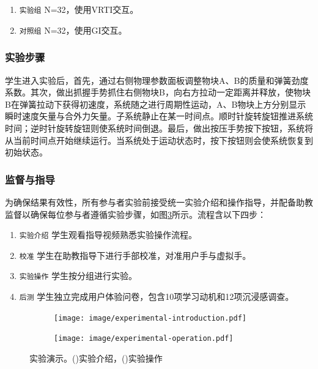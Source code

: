 \documentclass[runningheads]{llncs}
\begin{document}
\begin{enumerate}[label={\arabic*)}]
  \item \texttt{实验组} N=32，使用VRTI交互。
  \item \texttt{对照组} N=32，使用GI交互。
\end{enumerate}

\subsubsection{实验步骤}
学生进入实验后，首先，通过右侧物理参数面板调整物块A、B的质量和弹簧劲度系数。其次，做出抓握手势抓住右侧物块B，向右方拉动一定距离并释放，使物块B在弹簧拉动下获得初速度，系统随之进行周期性运动，A、B物块上方分别显示瞬时速度矢量与合外力矢量。子系统静止在某一时间点。顺时针旋转旋钮推进系统时间；逆时针旋转旋钮则使系统时间倒退。最后，做出按压手势按下按钮，系统将从当前时间点开始继续运行。当系统处于运动状态时，按下按钮则会使系统恢复到初始状态。

\subsubsection{监督与指导}
为确保结果有效性，所有参与者实验前接受统一实验介绍和操作指导，并配备助教监督以确保每位参与者遵循实验步骤，如图\ref{fig:experimental-procedure}所示。流程含以下四步：

\begin{enumerate}[label={\arabic*)}]
  \item \texttt{实验介绍} 学生观看指导视频熟悉实验操作流程。
  \item \texttt{校准} 学生在助教指导下进行手部校准，对准用户手与虚拟手。
  \item \texttt{实验操作} 学生按分组进行实验。
  \item \texttt{后测} 学生独立完成用户体验问卷，包含10项学习动机和12项沉浸感调查。
\end{enumerate}

\begin{figure}
  \begin{subfigure}{0.48\linewidth}
    \centering
    \texttt{[image: image/experimental-introduction.pdf]}
    \caption{}
    \label{fig:experimental-introduction}
  \end{subfigure}
  \hfill
  \begin{subfigure}{0.48\linewidth}
    \centering
    \texttt{[image: image/experimental-operation.pdf]}
    \caption{}
    \label{fig:experimental-operation}
  \end{subfigure}
  \caption{实验演示。()实验介绍，()实验操作}
  \label{fig:experimental-procedure}
\end{figure}
\end{document}
